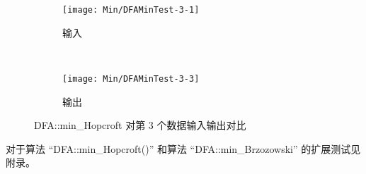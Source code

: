 \begin{figure}[!htbp]
    \centering
    \begin{subfigure}[b]{0.4\textwidth}
        \texttt{[image: Min/DFAMinTest-3-1]}
        \caption{输入}
        \label{fig:DFAMin-3-1-inside}
    \end{subfigure}
    ~
    \begin{subfigure}[b]{0.4\textwidth}
        \texttt{[image: Min/DFAMinTest-3-3]}
        \caption{输出}
        \label{fig:DFAMin-3-3-inside}
    \end{subfigure}
    \caption{DFA::min\_Hopcroft 对第 3 个数据输入输出对比}
    \label{fig:DFAMinHoop-3}
  \end{figure}

对于算法 “DFA::min\_Hopcroft()” 和算法 “DFA::min\_Brzozowski” 的扩展测试见附录。